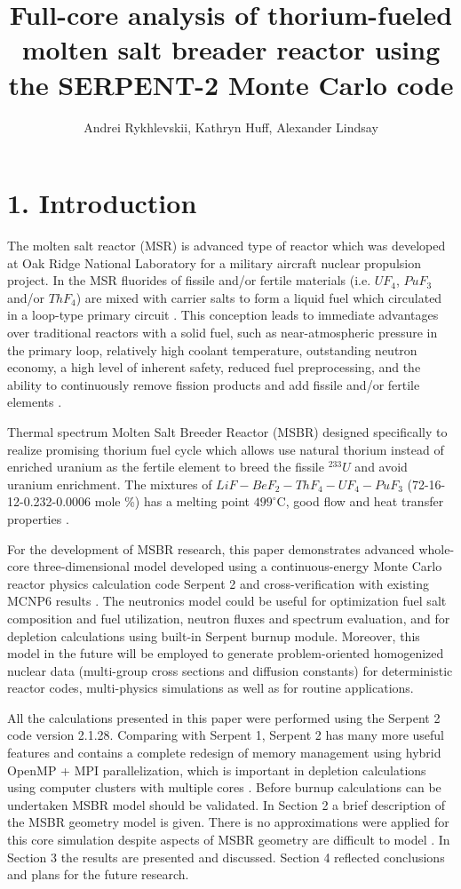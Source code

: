 \documentclass{anstrans}
\title{Full-core analysis of thorium-fueled molten salt breader reactor using the SERPENT-2 Monte Carlo code}
\author{Andrei Rykhlevskii, Kathryn Huff, Alexander Lindsay}
\institute{
Department of Nuclear, Plasma, and Radiological Engineering, University of Illinois at Urbana-Champaign
Urbana, IL
}
\begin{document}
\section{1. Introduction}
The molten salt reactor (MSR) is advanced type of reactor which was  developed at Oak Ridge National Laboratory for a military aircraft nuclear propulsion project. In the MSR fluorides of fissile and/or fertile materials (i.e. $UF_4$, $PuF_3$ and/or $ThF_4$) are mixed with carrier salts to form a liquid fuel which circulated in a loop-type primary circuit \cite{haubenreich_experience_1970}. This conception leads to immediate advantages over traditional reactors with a solid fuel, such as near-atmospheric pressure in the primary loop, relatively high coolant temperature, outstanding neutron economy, a high level of inherent safety, reduced fuel preprocessing, and the ability to continuously remove fission products and add fissile and/or fertile elements \cite{leblanc_molten_2010}. 

Thermal spectrum Molten Salt Breeder Reactor (MSBR) designed specifically to realize promising thorium fuel cycle which allows use natural thorium instead of enriched uranium as the fertile element to breed the fissile $^{233}U$ and avoid uranium enrichment. The mixtures of $LiF-BeF_2-ThF_4-UF_4-PuF_3$ (72-16-12-0.232-0.0006 mole \%) has a melting point $499^\circ$C, good flow and heat transfer properties \cite{robertson_conceptual_1971}.

For the development of MSBR research, this paper demonstrates advanced whole-core three-dimensional model developed using a continuous-energy Monte Carlo reactor physics calculation code Serpent 2 and cross-verification with existing MCNP6 results \cite{park_whole_2015,leppanen_serpent_2012}. The neutronics model could be useful for optimization fuel salt composition and fuel utilization, neutron fluxes and spectrum evaluation, and for depletion calculations using built-in Serpent burnup module. Moreover, this model in the future will be employed to generate problem-oriented homogenized nuclear data (multi-group cross sections and diffusion constants) for deterministic reactor codes, multi-physics simulations \cite{fridman_use_2011,valtavirta_coupled_2017} as well as for routine applications.

All the calculations presented in this paper were performed using the Serpent 2 code version 2.1.28. Comparing with Serpent 1, Serpent 2 has many more useful features and contains a complete redesign of memory management using hybrid OpenMP + MPI parallelization, which is important in depletion calculations using computer clusters with multiple cores \cite{leppanen_serpent_2015}. Before burnup calculations can be undertaken MSBR model should be validated. In Section 2 a brief description of the MSBR geometry model is given. There is no approximations were applied for this core simulation despite aspects of MSBR geometry are difficult to model \cite{park_whole_2015}. In Section 3 the results are presented and discussed. Section 4 reflected conclusions and plans for the future research.
\end{document}
